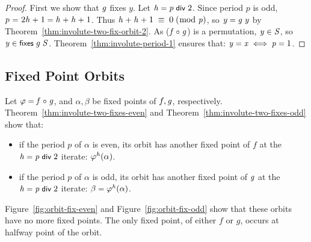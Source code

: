 \documentclass[sigplan,screen]{acmart}
\newcommand{\ee}{\ \HOLConst{=}\ } %
\renewcommand{\HOLinline}[1]{\ensuremath{#1}} %
\renewcommand{\HOLConst}[1]{{\fontsize{9pt}{1em}\selectfont\textsf{\upshape #1}}}
\renewcommand{\HOLNumLit}[1]{{\selectfont\textrm{\upshape #1}}} %
\renewcommand{\HOLSymConst}[1]{{\fontsize{9pt}{1em}\selectfont\textsf{\upshape #1}}}
\begin{document}
\begin{proof}
First we show that \HOLinline{\HOLFreeVar{g}} fixes $y$.
Let \HOLinline{\HOLFreeVar{h}\;\HOLSymConst{=}\;\HOLFreeVar{p}\;\HOLConst{\HOLConst{div}}\;\HOLNumLit{2}}.
Since period $p$ is odd, $p \ee \HOLinline{\HOLNumLit{2}\HOLSymConst{\ensuremath{}}\HOLFreeVar{h}\;\HOLSymConst{\ensuremath{+}}\;\HOLNumLit{1}\;\HOLSymConst{=}\;\HOLFreeVar{h}\;\HOLSymConst{\ensuremath{+}}\;\HOLFreeVar{h}\;\HOLSymConst{\ensuremath{+}}\;\HOLNumLit{1}}$.
Thus \HOLinline{\HOLFreeVar{h}\;\HOLSymConst{\ensuremath{+}}\;\HOLFreeVar{h}\;\HOLSymConst{\ensuremath{+}}\;\HOLNumLit{1}\;\ensuremath{\equiv}\;\HOLNumLit{0}\;\ensuremath{(}\ensuremath{\bmod}\;\HOLFreeVar{p}\ensuremath{)}},
so \HOLinline{\HOLFreeVar{y}\;\HOLSymConst{=}\;\HOLFreeVar{g}\;\HOLFreeVar{y}} by Theorem~\ref{thm:involute-two-fix-orbit-2}.
As (\HOLinline{\HOLFreeVar{f}\;\HOLSymConst{\HOLTokenCompose}\;\HOLFreeVar{g}}) is a permutation, \HOLinline{\HOLFreeVar{y}\;\HOLSymConst{\HOLTokenIn{}}\;\HOLFreeVar{S}}, so \HOLinline{\HOLFreeVar{y}\;\HOLSymConst{\HOLTokenIn{}}\;\HOLConst{fixes}\;\HOLFreeVar{g}\;\HOLFreeVar{S}}.
Theorem~\ref{thm:involute-period-1} ensures that: \HOLinline{\HOLFreeVar{y}\;\HOLSymConst{=}\;\HOLFreeVar{x}\;\HOLSymConst{\HOLTokenEquiv{}}\;\HOLFreeVar{p}\;\HOLSymConst{=}\;\HOLNumLit{1}}.
\end{proof}

\subsection{Fixed Point Orbits}
\label{sec:fixed-point-orbits}
Let \HOLinline{\HOLFreeVar{\varphi}\;\HOLSymConst{=}\;\HOLFreeVar{f}\;\HOLSymConst{\HOLTokenCompose}\;\HOLFreeVar{g}},
and $\alpha, \beta$ be fixed points of $f, \HOLinline{\HOLFreeVar{g}}$, respectively.
Theorem~\ref{thm:involute-two-fixes-even} and Theorem~\ref{thm:involute-two-fixes-odd} show that:
\begin{itemize}[leftmargin=*] %
\item if the period $p$ of $\alpha$ is even, its orbit has another fixed point of $f$ at the \HOLinline{\HOLFreeVar{h}\;\HOLSymConst{=}\;\HOLFreeVar{p}\;\HOLConst{\HOLConst{div}}\;\HOLNumLit{2}} iterate: \HOLinline{\HOLFreeVar{\varphi}\ensuremath{\sp{\HOLFreeVar{h}}(\HOLFreeVar{\alpha})}}.
\item if the period $p$ of $\alpha$ is odd, its orbit has another fixed point of \HOLinline{\HOLFreeVar{g}} at the \HOLinline{\HOLFreeVar{h}\;\HOLSymConst{=}\;\HOLFreeVar{p}\;\HOLConst{\HOLConst{div}}\;\HOLNumLit{2}} iterate: \HOLinline{\HOLFreeVar{\beta}\;\HOLSymConst{=}\;\HOLFreeVar{\varphi}\ensuremath{\sp{\HOLFreeVar{h}}(\HOLFreeVar{\alpha})}}.
\end{itemize}
Figure~\ref{fig:orbit-fix-even} and Figure~\ref{fig:orbit-fix-odd} show that these orbits have no more fixed points. The only fixed point, of either $f$ or $g$, occurs at halfway point of the orbit.
\end{document}
